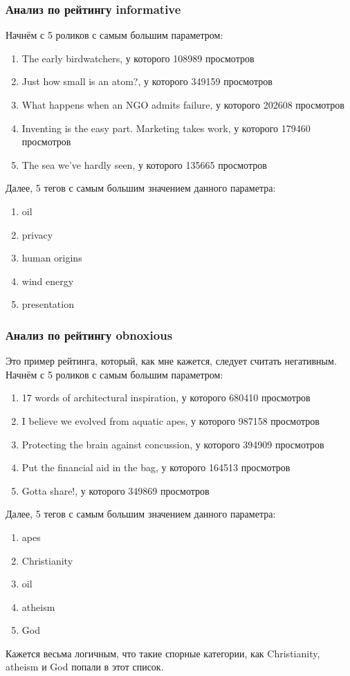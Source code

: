 \documentclass[12pt,a4paper]{scrartcl}
\begin{document}
\subsubsection{Анализ по рейтингу informative}
Начнём с 5 роликов с самым большим параметром: 
\begin{enumerate}
\item The early birdwatchers, у которого 108989 просмотров
\item Just how small is an atom?, у которого 349159 просмотров
\item What happens when an NGO admits failure, у которого 202608 просмотров
\item Inventing is the easy part. Marketing takes work, у которого 179460 просмотров
\item The sea we've hardly seen, у которого 135665 просмотров
\end{enumerate}
Далее, 5 тегов с самым большим значением данного параметра:
\begin{enumerate}
\item oil
\item privacy
\item human origins
\item wind energy
\item presentation
\end{enumerate}
\subsubsection{Анализ по рейтингу obnoxious}
Это пример рейтинга, который, как мне кажется, следует считать негативным. Начнём с 5 роликов с самым большим параметром: 
\begin{enumerate}
\item 17 words of architectural inspiration, у которого 680410 просмотров
\item I believe we evolved from aquatic apes, у которого 987158 просмотров
\item Protecting the brain against concussion, у которого 394909 просмотров
\item Put the financial aid in the bag, у которого 164513 просмотров
\item Gotta share!, у которого 349869 просмотров
\end{enumerate}
Далее, 5 тегов с самым большим значением данного параметра:
\begin{enumerate}
\item apes
\item Christianity
\item oil
\item atheism
\item God
\end{enumerate}
Кажется весьма логичным, что такие спорные категории, как Christianity, atheism и God попали в этот список.
\end{document}
